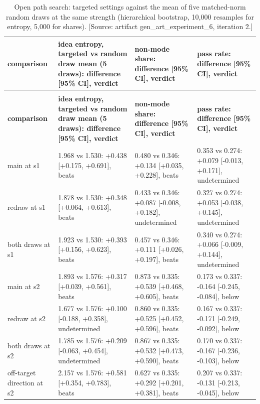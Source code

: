 \documentclass[11pt,letterpaper]{article}
\begin{document}
\begin{longtable}{@{}>{\raggedright\arraybackslash\hspace{0pt}}p{74.50pt}>{\raggedright\arraybackslash\hspace{0pt}}p{124.81pt}>{\raggedright\arraybackslash\hspace{0pt}}p{118.59pt}>{\raggedright\arraybackslash\hspace{0pt}}p{119.84pt}@{}}
\caption{Open path search: targeted settings against the mean of five matched-norm random draws at the same strength (hierarchical bootstrap, 10,000 resamples for entropy, 5,000 for shares). [Source: artifact gen\_art\_experiment\_6, iteration 2.]}\label{tab:72}\\
\toprule
\textbf{comparison} & \textbf{idea entropy, targeted vs random draw mean (5 draws): difference [95\% CI], verdict} & \textbf{non-mode share: difference [95\% CI], verdict} & \textbf{pass rate: difference [95\% CI], verdict} \\
\midrule
\endfirsthead
\multicolumn{4}{@{}l}{\emph{(continued)}}\\
\toprule
\textbf{comparison} & \textbf{idea entropy, targeted vs random draw mean (5 draws): difference [95\% CI], verdict} & \textbf{non-mode share: difference [95\% CI], verdict} & \textbf{pass rate: difference [95\% CI], verdict} \\
\midrule
\endhead
\bottomrule
\endlastfoot
main at s1 & 1.968 vs 1.530: +0.438 [+0.175, +0.691], beats & 0.480 vs 0.346: +0.134 [+0.035, +0.228], beats & 0.353 vs 0.274: +0.079 [-0.013, +0.171], undetermined \\
redraw at s1 & 1.878 vs 1.530: +0.348 [+0.064, +0.613], beats & 0.433 vs 0.346: +0.087 [-0.008, +0.182], undetermined & 0.327 vs 0.274: +0.053 [-0.038, +0.145], undetermined \\
both draws at s1 & 1.923 vs 1.530: +0.393 [+0.156, +0.623], beats & 0.457 vs 0.346: +0.111 [+0.026, +0.197], beats & 0.340 vs 0.274: +0.066 [-0.009, +0.144], undetermined \\
main at s2 & 1.893 vs 1.576: +0.317 [+0.039, +0.561], beats & 0.873 vs 0.335: +0.539 [+0.468, +0.605], beats & 0.173 vs 0.337: -0.164 [-0.245, -0.084], below \\
redraw at s2 & 1.677 vs 1.576: +0.100 [-0.188, +0.358], undetermined & 0.860 vs 0.335: +0.525 [+0.452, +0.596], beats & 0.167 vs 0.337: -0.171 [-0.249, -0.092], below \\
both draws at s2 & 1.785 vs 1.576: +0.209 [-0.063, +0.454], undetermined & 0.867 vs 0.335: +0.532 [+0.473, +0.590], beats & 0.170 vs 0.337: -0.167 [-0.236, -0.103], below \\
off-target direction at s2 & 2.157 vs 1.576: +0.581 [+0.354, +0.783], beats & 0.627 vs 0.335: +0.292 [+0.201, +0.381], beats & 0.207 vs 0.337: -0.131 [-0.213, -0.045], below \\
\end{longtable}
\end{document}
